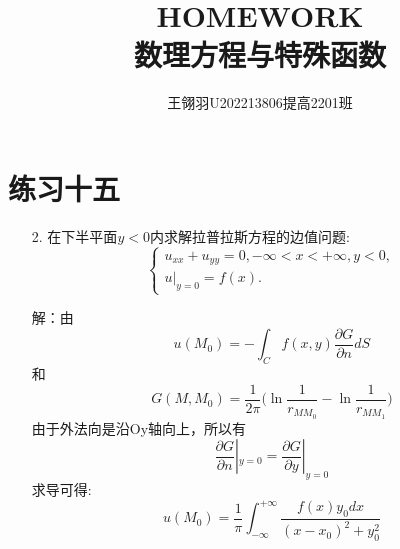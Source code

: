 \documentclass[11pt]{article}
\begin{document}
\title{\vspace{-2cm}HOMEWORK\\ 数理方程与特殊函数}
\author{王翎羽\quad U202213806\quad 提高2201班}
\maketitle

\section*{练习十五}
\begin{enumerate}
    \item[2.] 在下半平面$y<0$内求解拉普拉斯方程的边值问题:
     \begin{equation*}
        \left\{
         \begin{array}{lr}
         u_{xx}+u_{yy}=0,  -\infty<x<+\infty, y<0,\\u|_{y=0}=f(x).
         \end{array}
        \right.
     \end{equation*}

    解：由\[u(M_0)=-\displaystyle\int_{C}f(x,y)\dfrac{\partial G}{\partial n}dS\]
    和\[G(M,M_0)=\dfrac{1}{2\pi}\big(\ln\dfrac{1}{r_{MM_0}}-\ln\dfrac{1}{r_{MM_1}}\big)\]
    由于外法向是沿Oy轴向上，所以有\[\dfrac{\partial G}{\partial n}|_{y=0}=\dfrac{\partial G}{\partial y}|_{y=0}\]
    求导可得:\[u(M_0)=\dfrac{1}{\pi}\displaystyle\int_{-\infty}^{+\infty}\dfrac{f(x)y_0 dx}{(x-x_0)^2 +y_0 ^2}\]


\end{enumerate}
\end{document}

